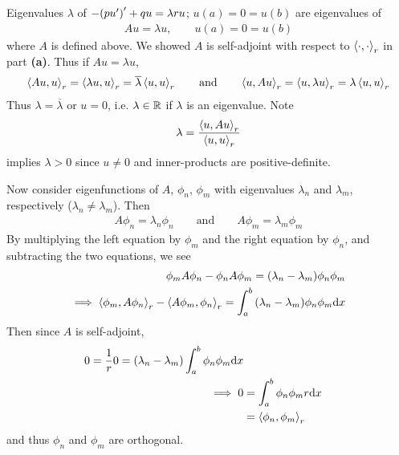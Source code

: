 \begin{enumerate}[\bf (a)]
        Eigenvalues $\lambda$ of $-\qty(pu')' + qu = \lambda r u$; $u(a) = 0 = u(b)$ are eigenvalues of
        \begin{align*}
            A u = \lambda u, \qquad u(a) = 0 = u(b)
        \end{align*}
        where $A$ is defined above.  We showed $A$ is self-adjoint with respect to $\left\langle \cdot, \cdot \right\rangle_r$ in part \textbf{(a)}.  Thus if $Au = \lambda u$,
        \begin{align*}
            \left\langle Au, u \right\rangle_r = \left\langle \lambda u, u \right\rangle_r = \overline{\lambda}\left\langle u, u \right\rangle_r \qquad \text{and} \qquad \left\langle u, Au \right\rangle_r = \left\langle u, \lambda u \right\rangle_r = \lambda\left\langle u, u \right\rangle_r
        \end{align*}
        Thus $\lambda = \overline{\lambda}$ or $u = 0$, i.e. $\lambda \in \mathbb{R}$ if $\lambda$ is an eigenvalue.  Note
        \begin{align*}
            \lambda = \frac{\left\langle u, Au \right\rangle_r}{\left\langle u, u \right\rangle_r}
        \end{align*}
        implies $\lambda > 0$ since $u \neq 0$ and inner-products are positive-definite.

        Now consider eigenfunctions of $A$, $\phi_n$, $\phi_m$ with eigenvalues $\lambda_n$ and $\lambda_m$, respectively ($\lambda_n \neq \lambda_m$).  Then
        \begin{align*}
            A\phi_n = \lambda_n \phi_n \qquad \text{and} \qquad A\phi_m = \lambda_m \phi_m
        \end{align*}
        By multiplying the left equation by $\phi_m$ and the right equation by $\phi_n$, and subtracting the two equations, we see
        \begin{align*}
            \phi_m A\phi_n - \phi_n A\phi_m = \qty(\lambda_n - \lambda_m)\phi_n\phi_m \\
            \implies \left\langle \phi_m, A\phi_n \right\rangle_r - \left\langle A\phi_m, \phi_n \right\rangle_r = \int_a^b \qty(\lambda_n - \lambda_m)\phi_n\phi_m \dd x
        \end{align*}
        Then since $A$ is self-adjoint,
        \begin{align*}
            0 = \frac{1}{r}0 = (\lambda_n - \lambda_m)\int_a^b \phi_n\phi_m \dd x \\
            \implies 0 &= \int_a^b\phi_n\phi_mr \dd x \\
            &= \left\langle \phi_n, \phi_m \right\rangle_r
        \end{align*}
        and thus $\phi_n$ and $\phi_m$ are orthogonal.
\end{enumerate}